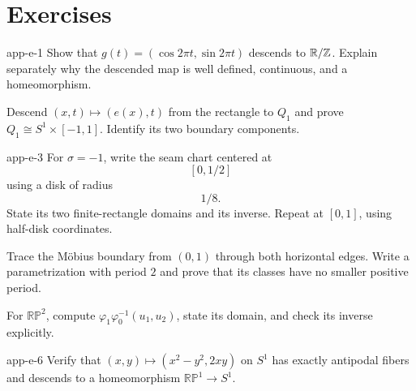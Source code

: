 \section*{Exercises}
\begin{hexercise}{app-e-1}
Show that $g(t)=(\cos 2\pi t,\sin 2\pi t)$ descends to $\mathbb{R}/\mathbb{Z}$.
Explain separately why the descended map is well defined, continuous,
and a homeomorphism.
\end{hexercise}
\begin{exercise}
Descend $(x,t)\mapsto(e(x),t)$ from the rectangle to $Q_1$ and prove
$Q_1\cong S^1\times[-1,1]$. Identify its two boundary components.
\end{exercise}
\begin{hexercise}{app-e-3}
For $\sigma=-1$, write the seam chart centered at
\[
[0,1/2]
\]
 using a disk
of radius
\[
1/8.
\]
 State its two finite-rectangle domains and its inverse.
Repeat at $[0,1]$, using half-disk coordinates.
\end{hexercise}
\begin{exercise}
Trace the M\"obius boundary from $(0,1)$ through both horizontal edges.
Write a parametrization with period $2$ and prove that its classes have
no smaller positive period.
\end{exercise}
\begin{exercise}
For $\mathbb{RP}^2$, compute $\varphi_1\varphi_0^{-1}(u_1,u_2)$,
state its domain, and check its inverse explicitly.
\end{exercise}
\begin{hexercise}{app-e-6}
Verify that $(x,y)\mapsto(x^2-y^2,2xy)$ on $S^1$ has exactly antipodal
fibers and descends to a homeomorphism $\mathbb{RP}^1\to S^1$.
\end{hexercise}
